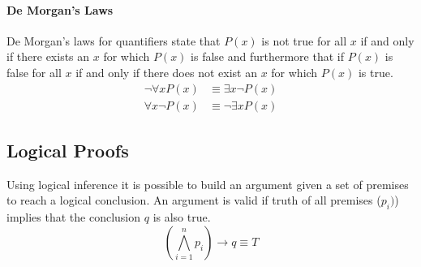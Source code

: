 \documentclass[a4paper, 10pt]{article}
\begin{document}
\paragraph{De Morgan's Laws}
De Morgan's laws for quantifiers state that \(P(x)\) is not true for all \(x\) if and only if there exists an \(x\) for which \(P(x)\) is false and furthermore that if \(P(x)\) is false for all \(x\) if and only if there does not exist an \(x\) for which \(P(x)\) is true.
\begin{align*}
    \neg\forall x P(x) &\equiv \exists x\neg P(x)\\
    \forall x\neg P(x) &\equiv \neg\exists x P(x)
\end{align*}

\subsection{Logical Proofs}
Using logical inference it is possible to build an argument given a set of premises to reach a logical conclusion. An argument is valid if truth of all premises (\(p_i)\)) implies that the conclusion \(q\) is also true.
\[\left(\bigwedge_{i=1}^n p_i\right)\rightarrow q \equiv T\]
\end{document}
